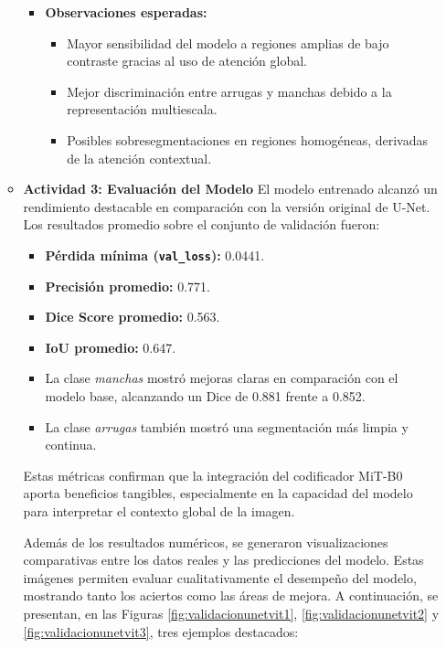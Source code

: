 \begin{enumerate}
\begin{itemize}
\begin{itemize}
    \item \textbf{Observaciones esperadas:}
    \begin{itemize}
    \item Mayor sensibilidad del modelo a regiones amplias de bajo contraste gracias al uso de atención global.
    \item Mejor discriminación entre arrugas y manchas debido a la representación multiescala.
    \item Posibles sobresegmentaciones en regiones homogéneas, derivadas de la atención contextual.
    \end{itemize}
    
    \end{itemize}

  \item\textbf{Actividad 3: Evaluación del Modelo}
  El modelo entrenado alcanzó un rendimiento destacable en comparación con la versión original de U-Net. Los resultados promedio sobre el conjunto de validación fueron:

\begin{itemize}
\item \textbf{Pérdida mínima (\texttt{val\_loss}):} 0.0441.
\item \textbf{Precisión promedio:} 0.771.
\item \textbf{Dice Score promedio:} 0.563.
\item \textbf{IoU promedio:} 0.647.
\item La clase \emph{manchas} mostró mejoras claras en comparación con el modelo base, alcanzando un Dice de 0.881 frente a 0.852.
\item La clase \emph{arrugas} también mostró una segmentación más limpia y continua.

\end{itemize}
Estas métricas confirman que la integración del codificador MiT-B0 aporta beneficios tangibles, especialmente en la capacidad del modelo para interpretar el contexto global de la imagen.



  Además de los resultados numéricos, se generaron visualizaciones comparativas entre los datos reales y las predicciones del modelo. Estas imágenes permiten evaluar cualitativamente el desempeño del modelo, mostrando tanto los aciertos como las áreas de mejora. A continuación, se presentan, en las Figuras \ref{fig:validacionunetvit1}, \ref{fig:validacionunetvit2} y \ref{fig:validacionunetvit3}, tres ejemplos destacados:

  \vspace{0.5cm}
  

\end{itemize}
\end{enumerate}
